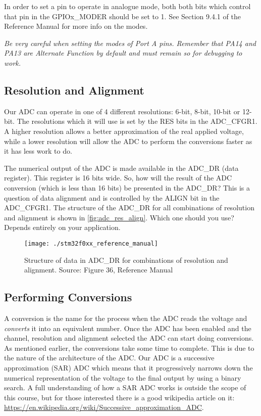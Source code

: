 In order to set a pin to operate in analogue mode, both both bits which control that pin in the GPIOx\_MODER should be set to 1. See Section 9.4.1 of the Reference Manual for more info on the modes. 

\emph{Be very careful when setting the modes of Port A pins. Remember that PA14 and PA13 are Alternate Function by default and must remain so for debugging to work.}


\subsection{Resolution and Alignment}
Our ADC can operate in one of 4 different resolutions: 6-bit, 8-bit, 10-bit or 12-bit. The resolutions which it will use is set by the RES bits in the ADC\_CFGR1. A higher resolution allows a better approximation of the real applied voltage, while a lower resolution will allow the ADC to perform the conversions faster as it has less work to do.

The numerical output of the ADC is made available in the ADC\_DR (data register). This register is 16 bits wide. So, how will the result of the ADC conversion (which is less than 16 bits) be presented in the ADC\_DR? This is a question of data alignment and is controlled by the ALIGN bit in the ADC\_CFGR1. The structure of the ADC\_DR for all combinations of resolution and alignment is shown in \autoref{fig:adc_res_align}. Which one should you use? Depends entirely on your application. 

\begin{figure}
\centering
\texttt{[image: ./stm32f0xx\_reference\_manual]}
\caption{Structure of data in ADC\_DR for combinations of resolution and alignment. Source: Figure 36, Reference Manual}
\label{fig:adc_res_align}
\end{figure}

\subsection{Performing Conversions}
A conversion is the name for the process when the ADC reads the voltage and \emph{converts} it into an equivalent number.
Once the ADC has been enabled and the channel, resolution and alignment selected the ADC can start doing conversions. As mentioned earlier, the conversions take some time to complete. This is due to the nature of the architecture of the ADC. Our ADC is a successive approximation (SAR) ADC which means that it progressively narrows down the numerical representation of the voltage to the final output by using a binary search. A full understanding of how a SAR ADC works is outside the scope of this course, but for those interested there is a good wikipedia article on it: \url{https://en.wikipedia.org/wiki/Successive_approximation_ADC}. 

